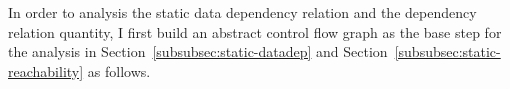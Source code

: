 %
%
In order to analysis the static data dependency relation and the dependency relation quantity,
I first build an abstract control flow graph as the base step for the analysis in Section~\ref{subsubsec:static-datadep}
and Section~\ref{subsubsec:static-reachability} as follows.

